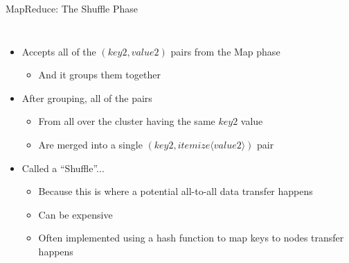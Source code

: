 \documentclass[aspectratio=169]{beamer}
\begin{document}
\begin{frame}{MapReduce: The Shuffle Phase}

\begin{columns}[c]
\begin{itemize}
\item Accepts all of the $(key2, value2)$ pairs from the Map phase
        \begin{itemize}
        \item And it groups them together
        \end{itemize}
\item After grouping, all of the pairs
        \begin{itemize}
        \item From all over the cluster having the same $key2$ value
	\item Are merged into a single $(key2, itemize \langle value2 \rangle)$ pair
        \end{itemize}
\item Called a ``Shuffle''...
        \begin{itemize}
        \item Because this is where a potential all-to-all data transfer happens
        \item Can be expensive
        \item Often implemented using a hash function to map keys to nodes
transfer happens
        \end{itemize}
\end{itemize}

\end{columns}
\end{frame}
\end{document}

